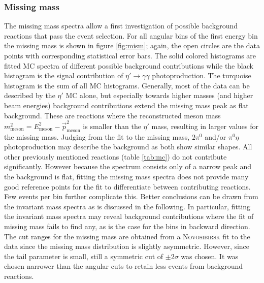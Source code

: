  \subsubsection{Missing mass}
 The missing mass spectra allow a first investigation of possible background reactions that pass the event selection. For all angular bins of the first energy bin the missing mass is shown in figure \ref{fig:mism}; again, the open circles are the data points with corresponding statistical error bars. The solid colored histograms are fitted MC spectra of different possible background contributions while the black histogram is the signal contribution of $\eta'\to\gamma\gamma$ photoproduction. The turquoise histogram is the sum of all MC histograms. Generally, most of the data can be described by the $\eta'$ MC alone, but especially towards higher masses (and higher beam energies) background contributions extend the missing mass peak as flat background. These are reactions where the reconstructed meson mass $m_\text{meson}^2=E_\text{meson}^2-\vec{p}_\text{meson}^2$ is smaller than the $\eta'$ mass, resulting in larger values for the missing mass. Judging from the fit to the missing mass, $2\pi^0$ and/or $\pi^0\eta$ photoproduction may describe the background as both show similar shapes. All other previously mentioned reactions (table \ref{tab:mc}) do not contribute significantly. However because the spectrum consists only of a narrow peak and the background is flat, fitting the missing mass spectra does not provide many good reference points for the fit to differentiate between contributing reactions. Few events per bin further complicate this. Better conclusions can be drawn from the invariant mass spectra as is discussed in the following. In particular, fitting the invariant mass spectra may reveal background contributions where the fit of missing mass fails to find any, as is the case for the bins in backward direction. The cut ranges for the missing mass are obtained from a \textsc{Novosibirsk} \cite{nov} fit to the data since the missing mass distribution is slightly asymmetric. However, since the tail parameter is small, still a symmetric cut of $\pm2\sigma$ was chosen. It was chosen narrower than the angular cuts to retain less events from 
 background reactions.
